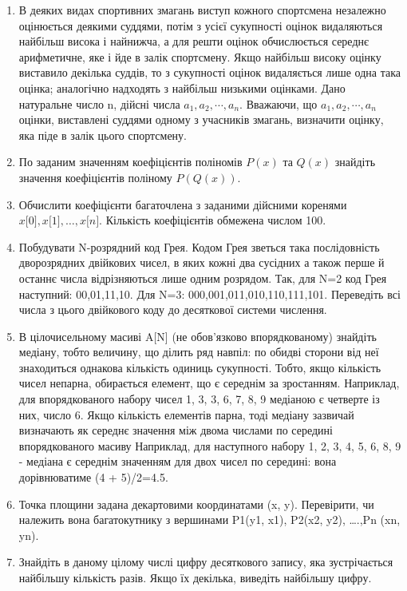 \documentclass[]{article}
\begin{document}
\begin{enumerate}
\item
  В деяких видах спортивних змагань виступ кожного спортсмена незалежно
  оцінюється деякими суддями, потім з усієї сукупності оцінок
  видаляються найбільш висока і найнижча, а для решти оцінок
  обчислюється середнє арифметичне, яке і йде в залік спортсмену. Якщо
  найбільш високу оцінку виставило декілька суддів, то з сукупності
  оцінок видаляється лише одна така оцінка; аналогічно надходять з
  найбільш низькими оцінками. Дано натуральне число n, дійсні числа
  \(a_{1},a_{2},\cdots,a_{n}\). Вважаючи, що
  \(a_{1},a_{2},\cdots,a_{n}\)оцінки, виставлені суддями одному з
  учасників змагань, визначити оцінку, яка піде в залік цього
  спортсмену.
\item
По заданим значенням коефіцієнтів поліномів $P(x)$ та $Q(x)$ знайдіть
значення коефіцієнтів поліному $P(Q(x))$.
\item
  Обчислити коефіцієнти багаточлена з заданими дійсними коренями 
$ x{[}0{]},x{[}1{]}, \ldots{}, x{[}n{]}$. Кількість коефіцієнтів обмежена
  числом 100.
\item
  Побудувати N-розрядний код Грея. Кодом Грея зветься така послідовність
  дворозрядних двійкових чисел, в яких кожні два сусідних а також перше
  й останнє числа відрізняються лише одним розрядом. Так, для N=2 код
  Грея наступний: 00,01,11,10. Для N=3: 000,001,011,010,110,111,101.
  Переведіть всі числа з цього двійкового коду до десяткової системи
  числення.
\item
  В цілочисельному масиві A{[}N{]} (не обов'язково впорядкованому)
  знайдіть медіану, тобто величину, що ділить ряд навпіл: по обидві
  сторони від неї знаходиться однакова кількість одиниць сукупності.
  Тобто, якщо кількість чисел непарна, обирається елемент, що є середнім
  за зростанням. Наприклад, для впорядкованого набору чисел 1, 3, 3, 6,
  7, 8, 9 медіаною є четверте із них, число 6. Якщо кількість елементів
  парна, тоді медіану зазвичай визначають як середнє значення між двома
  числами по середині впорядкованого масиву Наприклад, для наступного
  набору 1, 2, 3, 4, 5, 6, 8, 9 - медіана є середнім значенням для двох
  чисел по середині: вона дорівнюватиме (4 + 5)/2=4.5.
\item
Точка площини задана декартовими координатами (x, y). Перевірити, чи
належить вона багатокутнику з вершинами P1(y1, x1), P2(x2, y2),
\ldots{}.,Pn (xn, yn).
\item
Знайдіть в даному цілому числі цифру десяткового запису, яка
зустрічається найбільшу кількість разів. Якщо їх декілька, виведіть
найбільшу цифру.




\end{enumerate}
\end{document}
